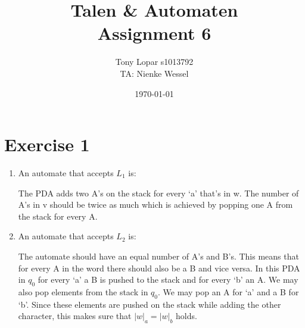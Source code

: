 \documentclass{article}
\begin{document}
\title{Talen \& Automaten \\ Assignment 6}
\date{\today}
\author{Tony Lopar \enspace s1013792 \\TA: Nienke Wessel}
\maketitle

\section*{Exercise 1}
\begin{enumerate}[label= \alph*)]
  \item An automate that accepts $L_1$ is:
  \begin{center}
  \end{center}
  The PDA adds two A's on the stack for every `a' that's in w. The number of A's in v should be twice as much which is achieved by popping one A from the stack for every A.
  \item An automate that accepts $L_2$ is:
  \begin{center}
  \end{center}
  The automate should have an equal number of A's and B's. This means that for every A in the word there should also be a B and vice versa. In this PDA in $q_0$ for every `a' a B is pushed to the stack and for every `b' an A. We may also pop elements from the stack in $q_0$. We may pop an A for `a' and a B for `b'. Since these elements are pushed on the stack while adding the other character, this makes sure that $|w|_a = |w|_b$ holds.


\end{enumerate}
\end{document}
